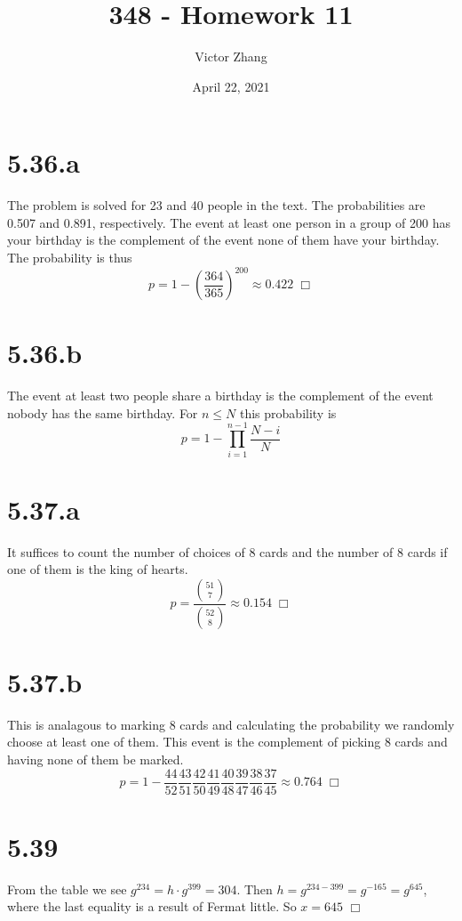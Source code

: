 \documentclass{article}
\title{348 - Homework 11}
\author{Victor Zhang}
\date{April 22, 2021}
\begin{document}
\maketitle

\section*{5.36.a}
The problem is solved for 23 and 40 people in the text. The probabilities are 0.507 and 0.891, respectively. The event at least one person in a group of 200 has your birthday is the complement of the event none of them have your birthday. The probability is thus
$$p = 1 - \left(\frac{364}{365}\right)^{200} \approx 0.422 \; \Box$$

\section*{5.36.b}
The event at least two people share a birthday is the complement of the event nobody has the same birthday. For $n \leq N$ this probability is
$$p = 1 - \prod_{i=1}^{n-1} \frac{N-i}{N}$$

\section*{5.37.a}
It suffices to count the number of choices of 8 cards and the number of 8 cards if one of them is the king of hearts.
$$p = \frac{\binom{51}{7}}{\binom{52}{8}} \approx 0.154 \; \Box$$

\section*{5.37.b}
This is analagous to marking 8 cards and calculating the probability we randomly choose at least one of them. This event is the complement of picking 8 cards and having none of them be marked.
$$p = 1 - \frac{44}{52}\frac{43}{51}\frac{42}{50}\frac{41}{49}\frac{40}{48}\frac{39}{47}\frac{38}{46}\frac{37}{45} \approx 0.764 \; \Box$$

\section*{5.39}
From the table we see $g^{234} = h \cdot g^{399} = 304$. Then $h = g^{234-399} = g^{-165} = g^{645}$, where the last equality is a result of Fermat little. So $x = 645$ $\Box$
\end{document}
